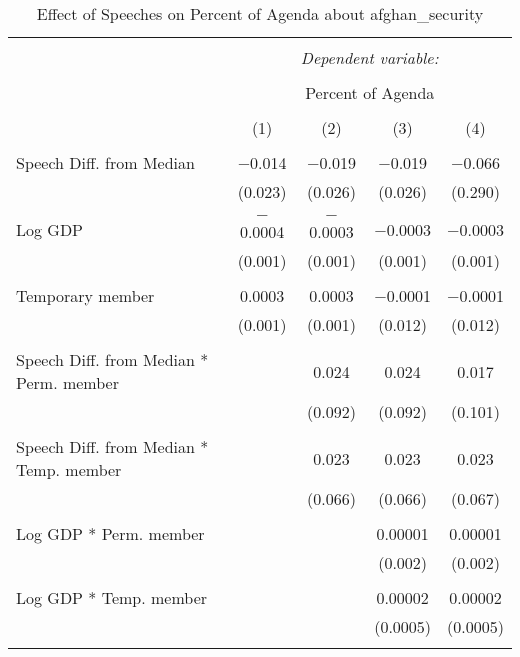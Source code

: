 
\begin{table}[!htbp] \centering 
  \caption{Effect of Speeches on Percent of Agenda about  afghan_security} 
  \label{} 
\begin{tabular}{@{\extracolsep{5pt}}lcccc} 
\\[-1.8ex]\hline 
\hline \\[-1.8ex] 
 & \multicolumn{4}{c}{\textit{Dependent variable:}} \\ 
\cline{2-5} 
\\[-1.8ex] & \multicolumn{4}{c}{Percent of Agenda} \\ 
\\[-1.8ex] & (1) & (2) & (3) & (4)\\ 
\hline \\[-1.8ex] 
 Speech Diff. from Median & $-$0.014 & $-$0.019 & $-$0.019 & $-$0.066 \\ 
  & (0.023) & (0.026) & (0.026) & (0.290) \\ 
  & & & & \\ 
 Log GDP & $-$0.0004 & $-$0.0003 & $-$0.0003 & $-$0.0003 \\ 
  & (0.001) & (0.001) & (0.001) & (0.001) \\ 
  & & & & \\ 
 Temporary member & 0.0003 & 0.0003 & $-$0.0001 & $-$0.0001 \\ 
  & (0.001) & (0.001) & (0.012) & (0.012) \\ 
  & & & & \\ 
 Speech Diff. from Median * Perm. member &  & 0.024 & 0.024 & 0.017 \\ 
  &  & (0.092) & (0.092) & (0.101) \\ 
  & & & & \\ 
 Speech Diff. from Median * Temp. member &  & 0.023 & 0.023 & 0.023 \\ 
  &  & (0.066) & (0.066) & (0.067) \\ 
  & & & & \\ 
 Log GDP * Perm. member &  &  & 0.00001 & 0.00001 \\ 
  &  &  & (0.002) & (0.002) \\ 
  & & & & \\ 
 Log GDP * Temp. member &  &  & 0.00002 & 0.00002 \\ 
  &  &  & (0.0005) & (0.0005) \\ 
  & & & & \\ 

\end{tabular}
\end{table}
